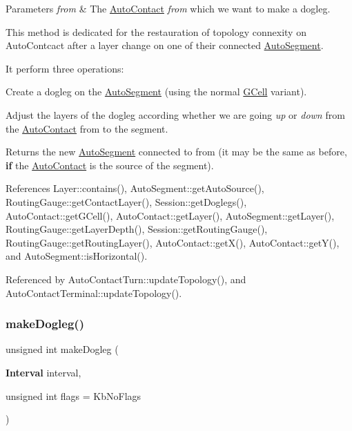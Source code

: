 \begin{DoxyParams}{Parameters}
{\em from} & The \mbox{\hyperlink{classKatabatic_1_1AutoContact}{Auto\+Contact}} {\itshape from} which we want to make a dogleg.\\
\hline
\end{DoxyParams}
This method is dedicated for the restauration of topology connexity on Auto\+Contcact after a layer change on one of their connected \mbox{\hyperlink{classKatabatic_1_1AutoSegment}{Auto\+Segment}}.

It perform three operations\+:
\begin{DoxyEnumerate}
\item Create a dogleg on the \mbox{\hyperlink{classKatabatic_1_1AutoSegment}{Auto\+Segment}} (using the normal \mbox{\hyperlink{classKatabatic_1_1GCell}{G\+Cell}} variant).
\item Adjust the layers of the dogleg according whether we are going {\itshape up} or {\itshape down} from the \mbox{\hyperlink{classKatabatic_1_1AutoContact}{Auto\+Contact}} {\ttfamily from} to the segment.
\item Returns the new \mbox{\hyperlink{classKatabatic_1_1AutoSegment}{Auto\+Segment}} connected to {\ttfamily from} (it may be the same as before, {\bfseries if} the \mbox{\hyperlink{classKatabatic_1_1AutoContact}{Auto\+Contact}} is the source of the segment). 
\end{DoxyEnumerate}

References Layer\+::contains(), Auto\+Segment\+::get\+Auto\+Source(), Routing\+Gauge\+::get\+Contact\+Layer(), Session\+::get\+Doglegs(), Auto\+Contact\+::get\+G\+Cell(), Auto\+Contact\+::get\+Layer(), Auto\+Segment\+::get\+Layer(), Routing\+Gauge\+::get\+Layer\+Depth(), Session\+::get\+Routing\+Gauge(), Routing\+Gauge\+::get\+Routing\+Layer(), Auto\+Contact\+::get\+X(), Auto\+Contact\+::get\+Y(), and Auto\+Segment\+::is\+Horizontal().



Referenced by Auto\+Contact\+Turn\+::update\+Topology(), and Auto\+Contact\+Terminal\+::update\+Topology().

\mbox{\label{classKatabatic_1_1AutoSegment_a5ca22c853ee33a2b26367eaf29457766}} 
\subsubsection{\texorpdfstring{make\+Dogleg()}{makeDogleg()}\hspace{0.1cm}{\footnotesize\ttfamily [2/3]}}
{\footnotesize\ttfamily unsigned int make\+Dogleg (\begin{DoxyParamCaption}\item[{\textbf{ Interval}}]{interval,  }\item[{unsigned int}]{flags = {\ttfamily KbNoFlags} }\end{DoxyParamCaption})}


